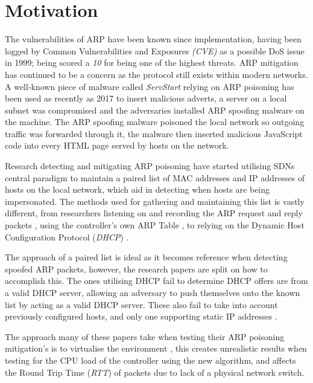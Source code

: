 \documentclass[12pt, oneside]{book}
\begin{document}
\newpage
\section{Motivation}
The vulnerabilities of ARP have been known since implementation, having been logged by
Common Vulnerabilities and Exposures \emph{(CVE)} as a possible DoS issue in 1999\cite{cve-1999-0667}; being scored a \emph{10}
for being one of the highest threats. ARP mitigation has continued to be a concern as the protocol still exists within
modern networks.
A well-known piece of malware called \emph{ServStart} relying on ARP poisoning has been used as recently as 2017 to
insert malicious adverts,
a server on a local subnet was compromised and the adversaries installed ARP spoofing malware
on the machine. The ARP spoofing malware poisoned the local network so outgoing traffic was forwarded through it,
the malware then inserted malicious JavaScript code into every HTML page served by hosts on the network\cite{doman_2017}.

Research detecting and mitigating ARP poisoning have started utilising SDNs central paradigm to maintain a paired 
list of MAC addresses and IP addresses of hosts on the local network, which aid in detecting when hosts are being
impersonated. The methods used for gathering and maintaining this list is vastly different, from researchers 
listening on and recording the ARP request and reply packets \cite{alharbi2016securing}, 
using the controller's own ARP Table \cite{matties2017distributed},
to relying on the Dynamic Host Configuration Protocol (\emph{DHCP}) \cite{masoud2015preventing}\cite{abdelsalam2015mitigating}.

The approach of a paired list is ideal as it becomes reference when detecting spoofed ARP packets, however, the research papers are
split on how to accomplish this. The ones utilising DHCP fail to determine DHCP offers are from a valid DHCP server,
allowing an adversary to push themselves onto the known list by acting as a valid DHCP server. These also fail to take into account previously configured hosts, and only one
supporting static IP addresses \cite{alharbi2016securing}.

The approach many of these papers take when testing their ARP poisoning mitigation's is to virtualise the environment
\cite{matties2017distributed}\cite{abdelsalam2015mitigating},
this creates unrealistic results when testing for the CPU load of the controller using the new algorithm, and affects
the Round Trip Time (\emph{RTT}) of packets due to lack of a physical network switch.
  
\end{document}
